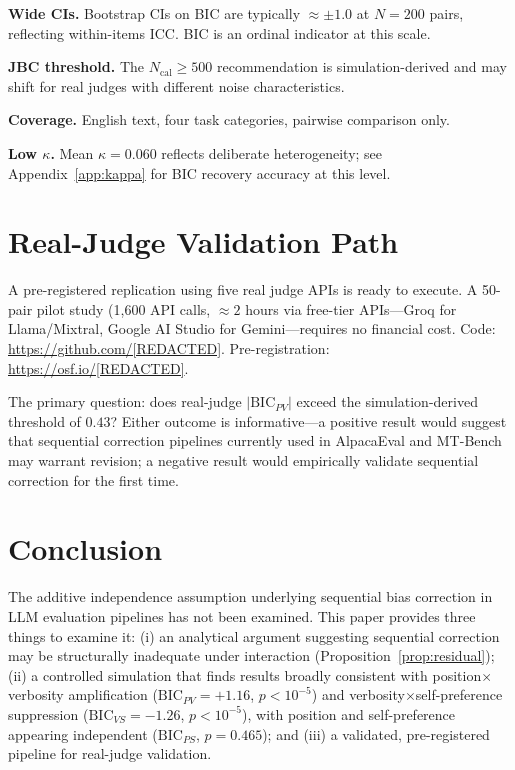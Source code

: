 \documentclass[10pt,conference]{IEEEtran}
\newcommand{\BIC}{\mathrm{BIC}}
\begin{document}
\textbf{Wide CIs.} Bootstrap CIs on BIC are typically
${\approx}\pm 1.0$ at $N{=}200$ pairs, reflecting
within-items ICC. BIC is an ordinal indicator at this scale.

\textbf{JBC threshold.} The $N_\text{cal}{\geq}500$
recommendation is simulation-derived and may shift for
real judges with different noise characteristics.

\textbf{Coverage.} English text, four task categories,
pairwise comparison only.

\textbf{Low $\kappa$.} Mean $\kappa{=}0.060$ reflects
deliberate heterogeneity; see Appendix~\ref{app:kappa}
for BIC recovery accuracy at this level.

\section{Real-Judge Validation Path}
\label{sec:future}

A pre-registered replication using five real judge APIs
is ready to execute.
A 50-pair pilot study (1,600 API calls, ${\approx}2$ hours
via free-tier APIs---Groq for Llama/Mixtral, Google AI Studio
for Gemini---requires no financial cost.
Code: \url{https://github.com/[REDACTED]}.
Pre-registration: \url{https://osf.io/[REDACTED]}.

The primary question: does real-judge $|\BIC_{PV}|$
exceed the simulation-derived threshold of $0.43$?
Either outcome is informative---a positive result
would suggest that sequential correction pipelines
currently used in AlpacaEval and MT-Bench may warrant
revision; a negative result would empirically validate
sequential correction for the first time.

\section{Conclusion}
\label{sec:conclusion}

The additive independence assumption underlying sequential
bias correction in LLM evaluation pipelines has not been
examined.
This paper provides three things to examine it:
(i) an analytical argument suggesting sequential correction
may be structurally inadequate under interaction
(Proposition~\ref{prop:residual});
(ii) a controlled simulation that finds results broadly
consistent with position$\times$verbosity amplification
($\BIC_{PV}{=}{+}1.16$, $p{<}10^{-5}$) and
verbosity$\times$self-preference suppression
($\BIC_{VS}{=}{-}1.26$, $p{<}10^{-5}$),
with position and self-preference appearing independent
($\BIC_{PS}$, $p{=}0.465$);
and (iii) a validated, pre-registered pipeline for
real-judge validation.
\end{document}
